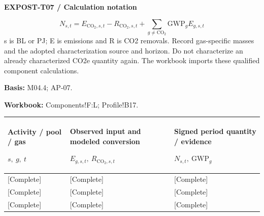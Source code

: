 \par\begingroup\sffamily\fontsize{8}{10}\selectfont\color{NEBGreen}\setlength{\parskip}{2pt}\setlength{\abovedisplayskip}{4pt}\setlength{\belowdisplayskip}{4pt}\setlength{\abovedisplayshortskip}{2pt}\setlength{\belowdisplayshortskip}{3pt}
\textbf{EXPOST-T07 / Calculation notation}\par
{\fontsize{9}{11}\selectfont\[ N_{s,t}=E_{\mathrm{CO_2},s,t}-R_{\mathrm{CO_2},s,t}+\sum_{g\ne\mathrm{CO_2}}\mathrm{GWP}_gE_{g,s,t} \]}
s is BL or PJ; E is emissions and R is CO2 removals. Record gas-specific masses and the adopted characterization source and horizon. Do not characterize an already characterized CO2e quantity again. The workbook imports these qualified component calculations.\par
\textbf{Basis:} M04.4; AP-07.\par
\textbf{Workbook:} Components!F:L; Profile!B17.\par\endgroup
{\sffamily\fontsize{8.3}{10.3}\selectfont\begin{longtable}{@{}P{54.83mm} P{54.83mm} P{54.83mm}@{}}
\toprule
\textbf{Activity / pool / gas}\par {\normalfont\fontsize{8.2}{10}\selectfont $s,\ g,\ t$} & \textbf{Observed input and modeled conversion}\par {\normalfont\fontsize{8.2}{10}\selectfont $E_{g,s,t},\ R_{\mathrm{CO_2},s,t}$} & \textbf{Signed period quantity / evidence}\par {\normalfont\fontsize{8.2}{10}\selectfont $N_{s,t},\ \mathrm{GWP}_g$}\\\midrule\endhead
\rule{0pt}{8mm}[Complete] & [Complete] & [Complete]\\\hline
\rule{0pt}{8mm}[Complete] & [Complete] & [Complete]\\\hline
\rule{0pt}{8mm}[Complete] & [Complete] & [Complete]\\\hline
\end{longtable}}
